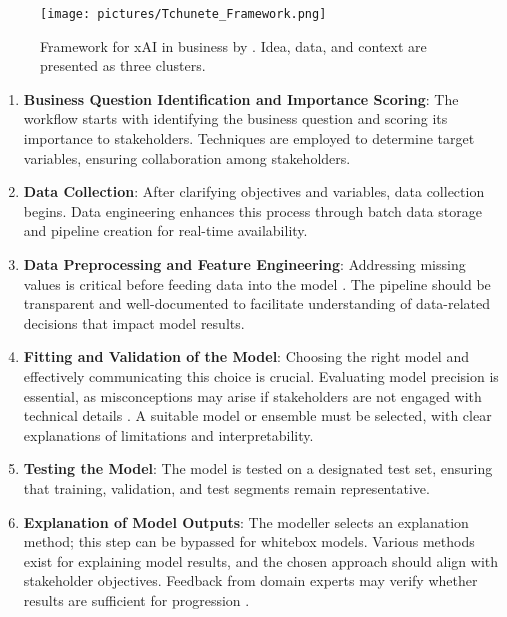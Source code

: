 \begin{figure}[ht!]
    \centering
    \texttt{[image: pictures/Tchunete\_Framework.png]}
    \caption{Framework for xAI in business by . Idea, data, and context are presented as three clusters.}
    \label{fig:tchuente}
\end{figure}
\FloatBarrier

\begin{enumerate}
    \item \textbf{Business Question Identification and Importance Scoring}: The workflow starts with identifying the business question and scoring its importance to stakeholders. Techniques are employed to determine target variables, ensuring collaboration among stakeholders.

    \item \textbf{Data Collection}: After clarifying objectives and variables, data collection begins. Data engineering enhances this process through batch data storage and pipeline creation for real-time availability.

    \item \textbf{Data Preprocessing and Feature Engineering}: Addressing missing values is critical before feeding data into the model . The pipeline should be transparent and well-documented to facilitate understanding of data-related decisions that impact model results.

    \item \textbf{Fitting and Validation of the Model}: Choosing the right model and effectively communicating this choice is crucial. Evaluating model precision is essential, as misconceptions may arise if stakeholders are not engaged with technical details . A suitable model or ensemble must be selected, with clear explanations of limitations and interpretability.

    \item \textbf{Testing the Model}: The model is tested on a designated test set, ensuring that training, validation, and test segments remain representative.

    \item \textbf{Explanation of Model Outputs}: The modeller selects an explanation method; this step can be bypassed for whitebox models. Various methods exist for explaining model results, and the chosen approach should align with stakeholder objectives. Feedback from domain experts may verify whether results are sufficient for progression .


\end{enumerate}
